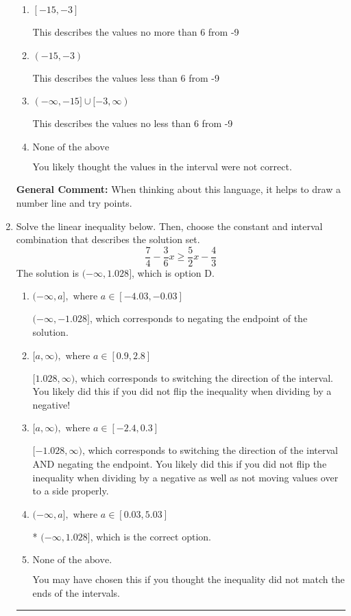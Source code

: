 \documentclass{extbook}[14pt]
\newcommand{\litem}[1]{\item #1

\rule{\textwidth}{0.4pt}}
\begin{document}
\begin{enumerate}
{\begin{enumerate}[label=\Alph*.]
This describes the values more than 6 from -9
\item \( [-15, -3] \)

This describes the values no more than 6 from -9
\item \( (-15, -3) \)

This describes the values less than 6 from -9
\item \( (-\infty, -15] \cup [-3, \infty) \)

This describes the values no less than 6 from -9
\item \( \text{None of the above} \)

You likely thought the values in the interval were not correct.
\end{enumerate}

\textbf{General Comment:} When thinking about this language, it helps to draw a number line and try points.
}
\litem{
Solve the linear inequality below. Then, choose the constant and interval combination that describes the solution set.
\[ \frac{7}{4} - \frac{3}{6} x \geq \frac{5}{2} x - \frac{4}{3} \]The solution is \( (-\infty, 1.028] \), which is option D.\begin{enumerate}[label=\Alph*.]
\item \( (-\infty, a], \text{ where } a \in [-4.03, -0.03] \)

 $(-\infty, -1.028]$, which corresponds to negating the endpoint of the solution.
\item \( [a, \infty), \text{ where } a \in [0.9, 2.8] \)

 $[1.028, \infty)$, which corresponds to switching the direction of the interval. You likely did this if you did not flip the inequality when dividing by a negative!
\item \( [a, \infty), \text{ where } a \in [-2.4, 0.3] \)

 $[-1.028, \infty)$, which corresponds to switching the direction of the interval AND negating the endpoint. You likely did this if you did not flip the inequality when dividing by a negative as well as not moving values over to a side properly.
\item \( (-\infty, a], \text{ where } a \in [0.03, 5.03] \)

* $(-\infty, 1.028]$, which is the correct option.
\item \( \text{None of the above}. \)

You may have chosen this if you thought the inequality did not match the ends of the intervals.
\end{enumerate}

}
\end{enumerate}
\end{document}
